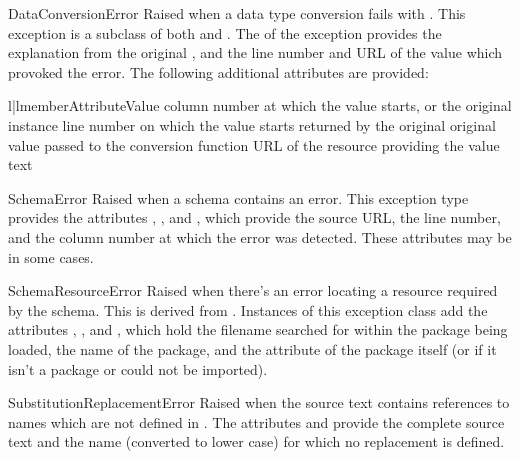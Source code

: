 \documentclass{howto}
\begin{document}
\begin{excdesc}{DataConversionError}
  Raised when a data type conversion fails with
  .  This exception is a subclass of both
   and .  The
   of the exception provides the explanation from the
  original , and the line number and URL of the
  value which provoked the error.  The following additional attributes
  are provided:

  \begin{tableii}{l|l}{member}{Attribute}{Value}
           {column number at which the value starts, or }
           {the original  instance}
           {line number on which the value starts}
           { returned by the original }
           {original value passed to the conversion function}
           {URL of the resource providing the value text}
  \end{tableii}
\end{excdesc}

\begin{excdesc}{SchemaError}
  Raised when a schema contains an error.  This exception type
  provides the attributes , , and
  , which provide the source URL, the line number, and
  the column number at which the error was detected.  These attributes
  may be  in some cases.
\end{excdesc}

\begin{excdesc}{SchemaResourceError}
  Raised when there's an error locating a resource required by the
  schema.  This is derived from .  Instances of
  this exception class add the attributes ,
  , and , which hold the filename
  searched for within the package being loaded, the name of the
  package, and the  attribute of the package itself (or
   if it isn't a package or could not be imported).
\end{excdesc}

\begin{excdesc}{SubstitutionReplacementError}
  Raised when the source text contains references to names which are
  not defined in .  The attributes  and
   provide the complete source text and the name
  (converted to lower case) for which no replacement is defined.
\end{excdesc}
\end{document}
